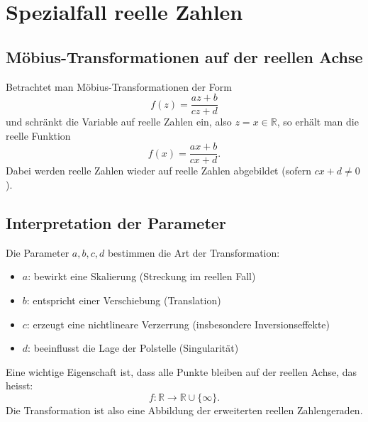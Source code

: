 %
%
%
%
\section{Spezialfall reelle Zahlen
\label{moebius:section:teil7}}

\subsection{Möbius-Transformationen auf der reellen Achse}
Betrachtet man Möbius-Transformationen der Form
\[
f(z) = \frac{az + b}{cz + d}
\]
und schränkt die Variable auf reelle Zahlen ein, also \( z = x \in \mathbb{R} \),
so erhält man die reelle Funktion
\[
f(x) = \frac{ax + b}{cx + d}.
\]
Dabei werden reelle Zahlen wieder auf reelle Zahlen abgebildet (sofern \(cx + d \neq 0\)).
\medskip
\\
\subsection{Interpretation der Parameter}
Die Parameter \(a, b, c, d\) bestimmen die Art der Transformation:
\begin{itemize}
	\item \(a\): bewirkt eine Skalierung (Streckung im reellen Fall)
	\item \(b\): entspricht einer Verschiebung (Translation)
	\item \(c\): erzeugt eine nichtlineare Verzerrung (insbesondere Inversionseffekte)
	\item \(d\): beeinflusst die Lage der Polstelle (Singularität)
\end{itemize}
\medskip
Eine wichtige Eigenschaft ist, dass alle Punkte bleiben auf der reellen Achse, das heisst:
\[
f : \mathbb{R} \to \mathbb{R} \cup \{\infty\}.
\]
Die Transformation ist also eine Abbildung der erweiterten reellen Zahlengeraden.
\medskip
\\
